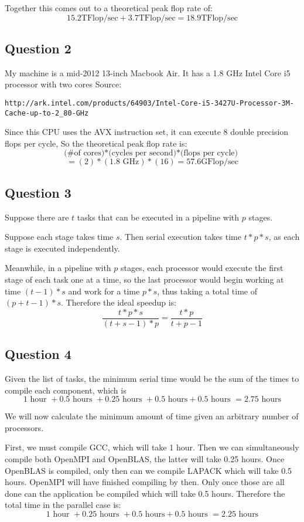 \documentclass[11pt]{article}
\begin{document}
Together this comes out to a theoretical peak flop rate of:
$$15.2 \mbox{TFlop/sec} + 3.7 \mbox{TFlop/sec} = 18.9 \mbox{TFlop/sec} $$

\subsection*{Question 2}

My machine is a mid-2012 13-inch Macbook Air. It has a 1.8 GHz Intel Core i5 processor with two cores
Source: 
\begin{verbatim}
http://ark.intel.com/products/64903/Intel-Core-i5-3427U-Processor-3M-Cache-up-to-2_80-GHz
\end{verbatim}

Since this CPU uses the AVX instruction set, it can execute 8 double precision flops per cycle,
So the theoretical peak flop rate is:
$$
\mbox{(\# of cores)*(cycles per second)*(flops per cycle) }
$$
$$
= (2)*(1.8 \mbox{ GHz})*(16) = 57.6 \mbox{GFlop/sec}
$$

\subsection*{Question 3}
Suppose there are $t$ tasks that can be executed in a pipeline with $p$ stages.

Suppose each stage takes time $s$. Then serial execution takes time $t*p*s$, as each stage is executed independently.

Meanwhile, in a pipeline with $p$ stages, each processor would execute the first stage of each task one at a time, so the last processor would begin working at time $(t-1)*s$ and work for a time $p*s$, thus taking a total time of $(p+t-1)*s$. Therefore the ideal speedup is:
$$
\frac{t*p*s}{(t+s-1)*p} = \frac{t*p}{t+p-1}
$$

\subsection*{Question 4}
Given the list of tasks, the minimum serial time would be the sum of the times to compile each component, which is
$$
1 \mbox{ hour } + 0.5 \mbox{ hours } + 0.25 \mbox{ hours } + 0.5 \mbox{ hours} + 0.5 \mbox{ hours } = 2.75 \mbox { hours}
$$

We will now calculate the minimum amount of time given an arbitrary number of processors.

First, we must compile GCC, which will take 1 hour. Then we can simultaneously compile both OpenMPI and OpenBLAS, the latter will take 0.25 hours. Once OpenBLAS is compiled, only then can we compile LAPACK which will take 0.5 hours. OpenMPI will have finished compiling by then. Only once those are all done can the application be compiled which will take 0.5 hours. Therefore the total time in the parallel case is:
$$
1 \mbox{ hour } + 0.25 \mbox{ hours } + 0.5 \mbox{ hours} + 0.5 \mbox{ hours } = 2.25 \mbox { hours}
$$
\end{document}

